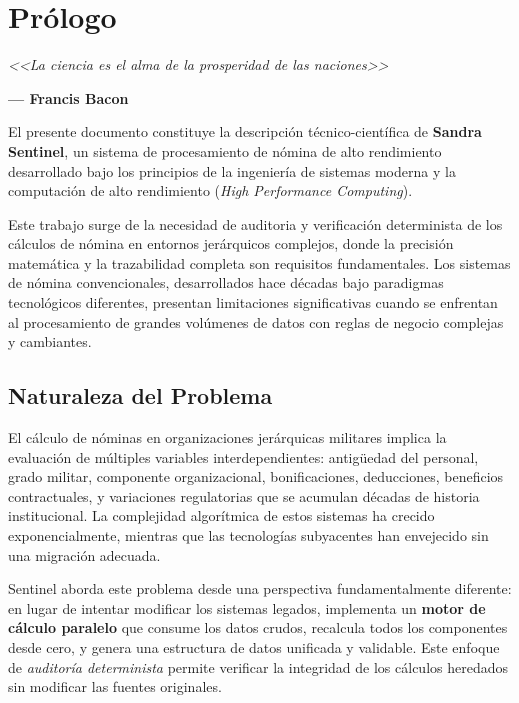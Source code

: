 \chapter*{Prólogo}

\begin{center}
    \textit{<<La ciencia es el alma de la prosperidad de las naciones>>}
    
    \vspace{0.5cm}
    
    \textbf{--- Francis Bacon}
\end{center}

\bigskip

\bigskip

El presente documento constituye la descripción técnico-científica de \textbf{Sandra Sentinel}, un sistema de procesamiento de nómina de alto rendimiento desarrollado bajo los principios de la ingeniería de sistemas moderna y la computación de alto rendimiento (\textit{High Performance Computing}).

Este trabajo surge de la necesidad de auditoria y verificación determinista de los cálculos de nómina en entornos jerárquicos complejos, donde la precisión matemática y la trazabilidad completa son requisitos fundamentales. Los sistemas de nómina convencionales, desarrollados hace décadas bajo paradigmas tecnológicos diferentes, presentan limitaciones significativas cuando se enfrentan al procesamiento de grandes volúmenes de datos con reglas de negocio complejas y cambiantes.

\bigskip

\section*{Naturaleza del Problema}

El cálculo de nóminas en organizaciones jerárquicas militares implica la evaluación de múltiples variables interdependientes: antigüedad del personal, grado militar, componente organizacional, bonificaciones, deducciones, beneficios contractuales, y variaciones regulatorias que se acumulan décadas de historia institucional. La complejidad algorítmica de estos sistemas ha crecido exponencialmente, mientras que las tecnologías subyacentes han envejecido sin una migración adecuada.

Sentinel aborda este problema desde una perspectiva fundamentalmente diferente: en lugar de intentar modificar los sistemas legados, implementa un \textbf{motor de cálculo paralelo} que consume los datos crudos, recalcula todos los componentes desde cero, y genera una estructura de datos unificada y validable. Este enfoque de \textit{auditoría determinista} permite verificar la integridad de los cálculos heredados sin modificar las fuentes originales.

